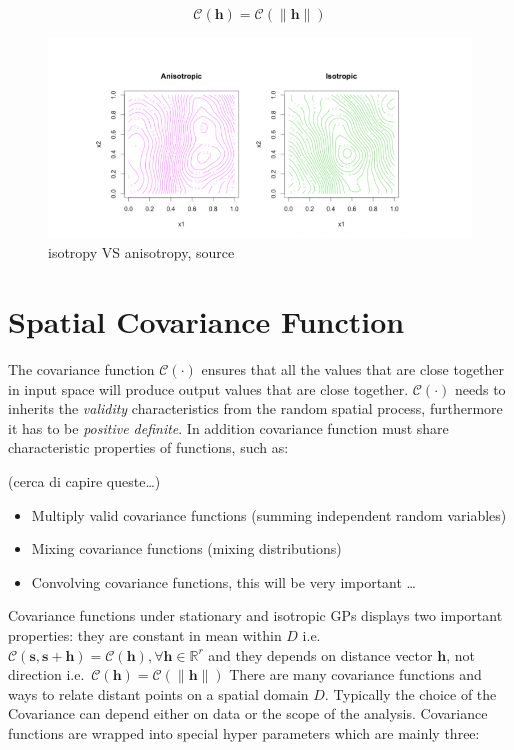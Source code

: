 \documentclass[
  12pt,
  a4paper,
  oneside]{book}
\providecommand{\tightlist}{%
  \setlength{\itemsep}{0pt}\setlength{\parskip}{0pt}}
\theoremstyle{definition}
\theoremstyle{definition}
\theoremstyle{definition}
\theoremstyle{remark}
\begin{document}
\[\mathcal{C}(\mathbf{h})=\mathcal{C}(\|\mathbf{h}\|)\]

\begin{figure}
\centering
\includegraphics{images/isotropyVSanisotropy.png}
\caption{isotropy VS anisotropy, source \citet{blanchetscalliet}}
\end{figure}

\hypertarget{spatial-covariance-function}{%
\section{Spatial Covariance Function}\label{spatial-covariance-function}}

The covariance function \(\mathcal{C}(\cdot)\) ensures that all the values that are close together in input space will produce output values that are close together. \(\mathcal{C}(\cdot)\) needs to inherits the \emph{validity} characteristics from the random spatial process, furthermore it has to be \emph{positive definite}.
In addition covariance function must share characteristic properties of functions, such as:

(cerca di capire queste\ldots)

\begin{itemize}
\tightlist
\item
  Multiply valid covariance functions (summing independent random variables)
\item
  Mixing covariance functions (mixing distributions)
\item
  Convolving covariance functions, this will be very important \ldots{}
\end{itemize}

Covariance functions under stationary and isotropic GPs displays two important properties: they are constant in mean within \(D\) i.e.~\(\mathcal{C}(\mathbf{s}, \mathbf{s}+\mathbf{h})=\mathcal{C}(\mathbf{h}), \forall \mathbf{h} \in \mathbb{R}^{r}\) and they depends on distance vector \(\mathbf{h}\), not direction i.e.~\(\mathcal{C}(\mathbf{h})=\mathcal{C}(\|\mathbf{h}\|)\)
There are many covariance functions and ways to relate distant points on a spatial domain \(D\). Typically the choice of the Covariance can depend either on data or the scope of the analysis. Covariance functions are wrapped into special hyper parameters which are mainly three:
\end{document}

